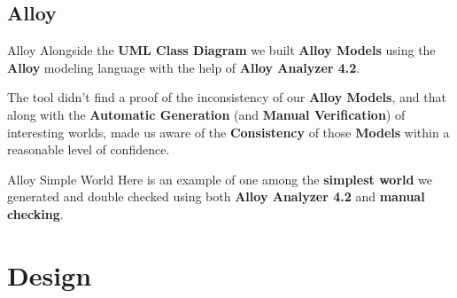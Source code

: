 \documentclass{../Common/Structure/pdf_presentation}
\begin{document}
	\subsection{Alloy}
	\begin{frame}{Alloy}
		Alongside the \textbf{UML Class Diagram} we built \textbf{Alloy Models} using the \textbf{Alloy} modeling language with the help of \textbf{Alloy Analyzer 4.2}.\par
		The tool didn't find a proof of the inconsistency of our \textbf{Alloy Models}, and that along with the \textbf{Automatic Generation} (and \textbf{Manual Verification}) of interesting worlds, made us aware of the \textbf{Consistency} of those \textbf{Models} within a reasonable level of confidence.
	\end{frame}
	\begin{frame}{Alloy Simple World}
		Here is an example of one among the \textbf{simplest world} we generated and double checked using both \textbf{Alloy Analyzer 4.2} and \textbf{manual checking}.
	\end{frame}
	\section{Design}
\end{document}
